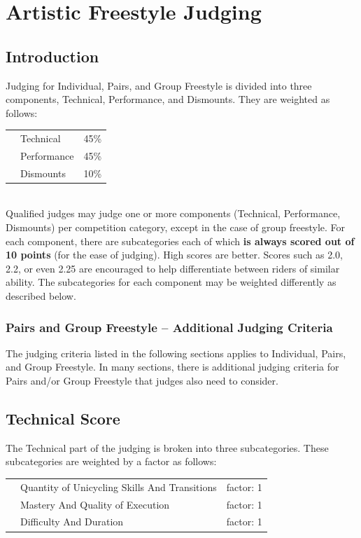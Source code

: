 \chapter{Artistic Freestyle Judging}
\section{Introduction}
Judging for Individual, Pairs, and Group Freestyle is divided into three components, Technical, Performance, and Dismounts.
They are weighted as follows:

\begin{tabular}{l l l}
 & Technical & 45\% \\
 & Performance & 45\% \\
 & Dismounts & 10\% \\
\end{tabular}\\

Qualified judges may judge one or more components (Technical, Performance, Dismounts) per competition category, except in the case of group freestyle.
For each component, there are subcategories each of which \textbf{is always scored out of 10 points} (for the ease of judging).
High scores are better.
Scores such as 2.0, 2.2, or even 2.25 are encouraged to help differentiate between riders of similar ability.
The subcategories for each component may be weighted differently as described below.

\subsection{Pairs and Group Freestyle -- Additional Judging Criteria}
The judging criteria listed in the following sections applies to Individual, Pairs, and Group Freestyle. In many sections, there is additional judging criteria for Pairs and/or Group Freestyle that judges also need to consider.

\section{Technical Score \label{sec:freestyle_technical-score}}
The Technical part of the judging is broken into three subcategories.
These subcategories are weighted by a factor as follows:

\begin{tabular}{l l l}
 & Quantity of Unicycling Skills And Transitions & factor: 1 \\
 & Mastery And Quality of Execution & factor: 1 \\
 & Difficulty And Duration & factor: 1 \\
\end{tabular}

